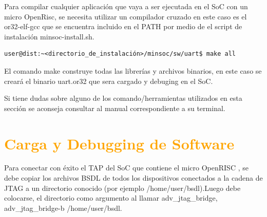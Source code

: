 \documentclass[a4paper,11pt]{article}
\begin{document}
Para compilar cualquier aplicación que vaya a ser ejecutada en el SoC con un micro OpenRisc, se necesita utilizar un compilador cruzado en este caso es el or32-elf-gcc que se encuentra incluido en el PATH por medio de el script de instalación minsoc-install.sh.

\begin{verbatim}
user@dist:~<directorio_de_instalación>/minsoc/sw/uart$ make all
\end{verbatim}
 
El comando make construye todas las librerías y archivos binarios, en este caso se creará el binario uart.or32 que sera cargado y debuging en el SoC.
 

Si tiene dudas sobre alguno de los comando/herramientas utilizados en esta sección se aconseja consultar al manual correspondiente a su terminal.


\section{\textcolor{orange}{Carga y Debugging de Software}}


Para conectar con éxito el TAP del SoC que contiene el micro OpenRISC , se debe copiar los archivos BSDL de todos los dispositivos conectados a la cadena de JTAG a un directorio conocido (por ejemplo /home/user/bsdl).Luego debe colocarse, el directorio como argumento al llamar adv\_jtag\_bridge, adv\_jtag\_bridge-b /home/user/bsdl.
\end{document}
